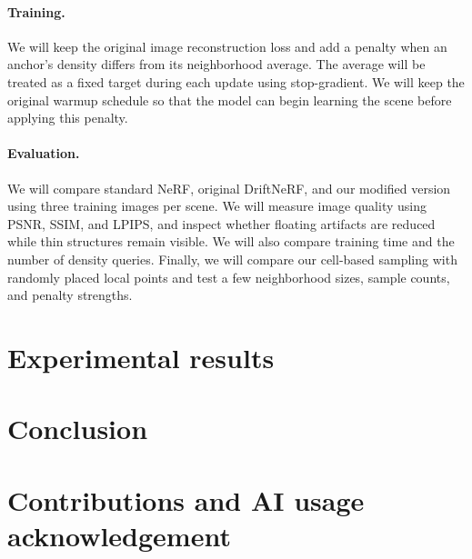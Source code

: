 \documentclass[sigconf]{acmart}
\begin{document}
\paragraph{Training.}
We will keep the original image reconstruction loss and add a penalty when an anchor's density differs from its neighborhood average. The average will be treated as a fixed target during each update using stop-gradient. We will keep the original warmup schedule so that the model can begin learning the scene before applying this penalty.

\paragraph{Evaluation.}
We will compare standard NeRF, original DriftNeRF, and our modified version using three training images per scene. We will measure image quality using PSNR, SSIM, and LPIPS, and inspect whether floating artifacts are reduced while thin structures remain visible. We will also compare training time and the number of density queries. Finally, we will compare our cell-based sampling with randomly placed local points and test a few neighborhood sizes, sample counts, and penalty strengths.

\section{Experimental results}



\section{Conclusion} 


\section{Contributions and AI usage acknowledgement}




\end{document}
